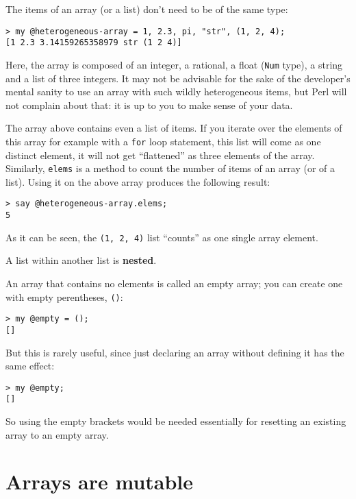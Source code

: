 The items of an array (or a list) don't need to be of the 
same type:

\begin{verbatim}
> my @heterogeneous-array = 1, 2.3, pi, "str", (1, 2, 4);
[1 2.3 3.14159265358979 str (1 2 4)]
\end{verbatim}

Here, the array is composed of an integer, a rational, a 
float ({\tt Num} type), a string and a list of three integers. 
It may not be advisable for the sake of the developer's 
mental sanity to use an array with such wildly heterogeneous 
items, but Perl will not complain about that: it is up 
to you to make sense of your data.

The array above contains even a list of items. If you iterate 
over the elements of this array for example with a {\tt for} 
loop statement, this list will come as one distinct element, 
it will not get ``flattened'' as three elements 
of the array. Similarly, {\tt elems} is a method to 
count the number of items of an array (or of a list). 
Using it on the above array produces the following result:

\begin{verbatim}
> say @heterogeneous-array.elems;
5
\end{verbatim}
%

As it can be seen, the \verb'(1, 2, 4)' list ``counts'' 
as one single array element.

A list within another list is {\bf nested}.

An array that contains no elements is
called an empty array; you can create one with empty
perentheses, \verb"()":
\begin{verbatim}
> my @empty = ();
[]
\end{verbatim}

But this is rarely useful, since just declaring an array 
without defining it has the same effect:

\begin{verbatim}
> my @empty;
[]
\end{verbatim}

So using the empty brackets would be needed essentially for 
resetting an existing array to an empty array.


\section{Arrays are mutable}
\label{mutable}

